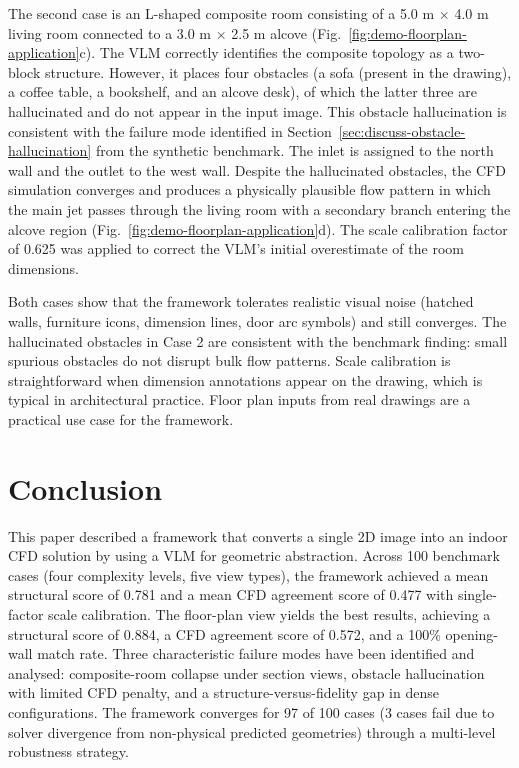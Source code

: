 \documentclass[preprint,12pt,number]{elsarticle}
\begin{document}
The second case is an L-shaped composite room consisting of a 5.0 m $\times$ 4.0 m living room connected to a 3.0 m $\times$ 2.5 m alcove (Fig.~\ref{fig:demo-floorplan-application}c). The VLM correctly identifies the composite topology as a two-block structure. However, it places four obstacles (a sofa (present in the drawing), a coffee table, a bookshelf, and an alcove desk), of which the latter three are hallucinated and do not appear in the input image. This obstacle hallucination is consistent with the failure mode identified in Section~\ref{sec:discuss-obstacle-hallucination} from the synthetic benchmark. The inlet is assigned to the north wall and the outlet to the west wall. Despite the hallucinated obstacles, the CFD simulation converges and produces a physically plausible flow pattern in which the main jet passes through the living room with a secondary branch entering the alcove region (Fig.~\ref{fig:demo-floorplan-application}d). The scale calibration factor of 0.625 was applied to correct the VLM's initial overestimate of the room dimensions.

Both cases show that the framework tolerates realistic visual noise (hatched walls, furniture icons, dimension lines, door arc symbols) and still converges. The hallucinated obstacles in Case 2 are consistent with the benchmark finding: small spurious obstacles do not disrupt bulk flow patterns. Scale calibration is straightforward when dimension annotations appear on the drawing, which is typical in architectural practice. Floor plan inputs from real drawings are a practical use case for the framework.

\section{Conclusion}
\label{sec:conclusion}


This paper described a framework that converts a single 2D image into an indoor CFD solution by using a VLM for geometric abstraction. Across 100 benchmark cases (four complexity levels, five view types), the framework achieved a mean structural score of 0.781 and a mean CFD agreement score of 0.477 with single-factor scale calibration. The floor-plan view yields the best results, achieving a structural score of 0.884, a CFD agreement score of 0.572, and a 100\% opening-wall match rate. Three characteristic failure modes have been identified and analysed: composite-room collapse under section views, obstacle hallucination with limited CFD penalty, and a structure-versus-fidelity gap in dense configurations. The framework converges for 97 of 100 cases (3 cases fail due to solver divergence from non-physical predicted geometries) through a multi-level robustness strategy.
\end{document}
